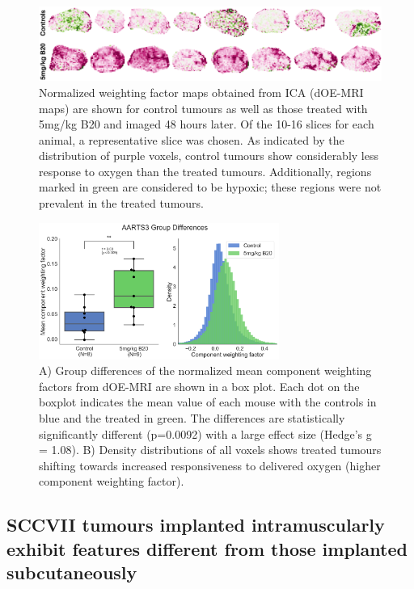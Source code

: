 \documentclass[num-refs]{wiley-article}
\begin{document}
\begin{figure}[htbp]
   \centering
   \includegraphics[width=\textwidth]{images/1_aarts3_b20_dOEMRI.png} %
   \caption{Normalized weighting factor maps obtained from ICA (dOE-MRI maps) are shown for control tumours as well as those treated with 5mg/kg B20 and imaged 48 hours later.
   Of the 10-16 slices for each animal, a representative slice was chosen.
   As indicated by the distribution of purple voxels, control tumours show considerably less response to oxygen than the treated tumours.
   Additionally, regions marked in green are considered to be hypoxic; these regions were not prevalent in the treated tumours.}
   \label{dOEMRImaps}
\end{figure}

\begin{figure}[htbp]
   \centering
   \includegraphics[width=0.7\textwidth]{images/2_aarts3_b20_boxplot_dOEMRI.png} %
   \caption{A) Group differences of the normalized mean component weighting factors from dOE-MRI are shown in a box plot.
   Each dot on the boxplot indicates the mean value of each mouse with the controls in blue and the treated in green.
   The differences are statistically significantly different (p=0.0092) with a large effect size (Hedge's g = 1.08).
   B) Density distributions of all voxels shows treated tumours shifting towards increased responsiveness to delivered oxygen (higher component weighting factor).}
   \label{aarts3boxplot}
\end{figure}

\subsection{SCCVII tumours implanted intramuscularly exhibit features different from those implanted subcutaneously}
\end{document}
